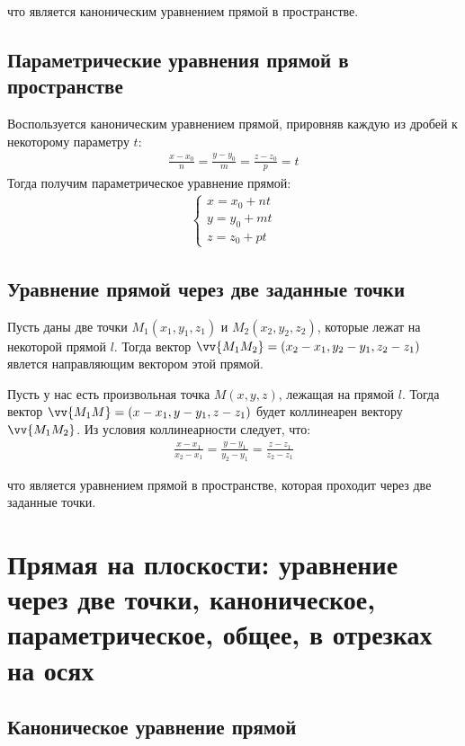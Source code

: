 \documentclass[a4paper,12pt]{extbook}
\theoremstyle{numbered}
\theoremstyle{named}
\theoremstyle{named}
\theoremstyle{named}
\begin{document}
что является каноническим уравнением прямой в пространстве.

\subsection*{Параметрические уравнения прямой в пространстве}
Воспользуется каноническим уравнением прямой, прировняв каждую из дробей к некоторому параметру \(t\):
\begin{gather*}
    \frac{x - x_0}{n} = \frac{y - y_0}{m} = \frac{z - z_0}{p} = t
\end{gather*}
Тогда получим параметрическое уравнение прямой:
\begin{gather*}
    \begin{cases}
        x = x_0 + nt \\
        y = y_0 + mt \\
        z = z_0 + pt
    \end{cases}
\end{gather*}

\subsection*{Уравнение прямой через две заданные точки}
Пусть даны две точки \(M_1(x_1, y_1, z_1)\) и \(M_2(x_2, y_2, z_2)\), которые лежат на некоторой прямой \(l\). Тогда вектор  \(\vv{M_1M_2} = (x_2 - x_1, y_2 - y_1, z_2 - z_1)\) явлется направляющим вектором этой прямой.

Пусть у нас есть произвольная точка \(M(x, y, z)\), лежащая на прямой \(l\). Тогда вектор \(\vv{M_1M} = (x - x_1, y - y_1, z - z_1)\) будет коллинеарен вектору \(\vv{M_1M_2}\). Из условия коллинеарности следует, что:
\begin{gather*}
    \frac{x - x_1}{x_2 - x_1} = \frac{y - y_1}{y_2 - y_1} = \frac{z - z_1}{z_2 - z_1}
\end{gather*}

что является уравнением прямой в пространстве, которая проходит через две заданные точки.

\section{Прямая на плоскости: уравнение через две точки, каноническое, параметрическое, общее, в отрезках на осях}\label{sec:line_on_plane}

\subsection*{Каноническое уравнение прямой}
\end{document}
